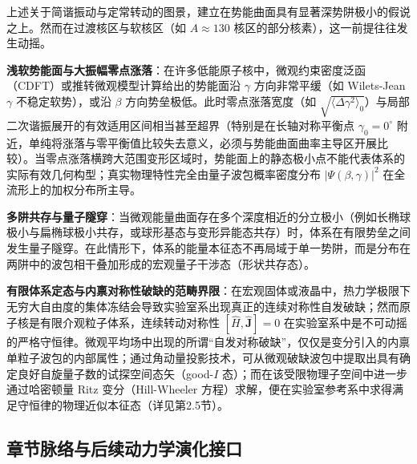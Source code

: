 上述关于简谐振动与定常转动的图景，建立在势能曲面具有显著深势阱极小的假说之上。然而在过渡核区与软核区（如 $A \approx 130$ 核区的部分核素），这一前提往往发生动摇。

\textbf{浅软势能面与大振幅零点涨落}：在许多低能原子核中，微观约束密度泛函（CDFT）或推转微观模型计算给出的势能面沿 $\gamma$ 方向非常平缓（如 Wilets-Jean $\gamma$ 不稳定软势），或沿 $\beta$ 方向势垒极低。此时零点涨落宽度（如 $\sqrt{\langle \Delta \gamma^2 \rangle_0}$）与局部二次谐振展开的有效适用区间相当甚至超界（特别是在长轴对称平衡点 $\gamma_0 = 0^\circ$ 附近，单纯将涨落与零平衡值比较失去意义，必须与势能曲面曲率主导区开展比较）。当零点涨落横跨大范围变形区域时，势能面上的静态极小点不能代表体系的实际有效几何构型；真实物理特性完全由量子波包概率密度分布 $|\Psi(\beta, \gamma)|^2$ 在全流形上的加权分布所主导。

\textbf{多阱共存与量子隧穿}：当微观能量曲面存在多个深度相近的分立极小（例如长椭球极小与扁椭球极小共存，或球形基态与变形异能态共存）时，体系在有限势垒之间发生量子隧穿。在此情形下，体系的能量本征态不再局域于单一势阱，而是分布在两阱中的波包相干叠加形成的宏观量子干涉态（形状共存态）。

\textbf{有限体系定态与内禀对称性破缺的范畴界限}：在宏观固体或液晶中，热力学极限下无穷大自由度的集体冻结会导致实验室系出现真正的连续对称性自发破缺；然而原子核是有限介观粒子体系，连续转动对称性 $[\hat{H}, \hat{\mathbf{J}}] = 0$ 在实验室系中是不可动摇的严格守恒律。微观平均场中出现的所谓“自发对称破缺”，仅仅是变分引入的内禀单粒子波包的内部属性；通过角动量投影技术，可从微观破缺波包中提取出具有确定良好自旋量子数的试探空间态矢（good-$I$ 态）；而在该受限物理子空间中进一步通过哈密顿量 Ritz 变分（Hill-Wheeler 方程）求解，便在实验室参考系中求得满足守恒律的物理近似本征态（详见第2.5节）。

\subsection{章节脉络与后续动力学演化接口}\label{sec:3-1-5}

